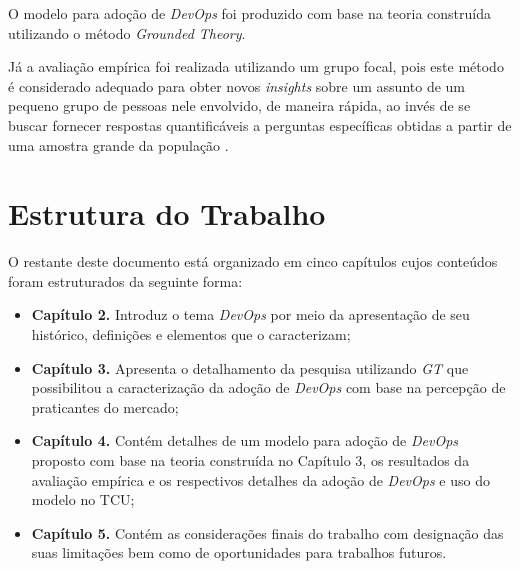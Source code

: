 O modelo para adoção de \textit{DevOps} foi produzido com base na teoria
construída utilizando o método \textit{Grounded Theory}.

Já a avaliação empírica foi realizada utilizando um grupo focal, pois este
método é considerado adequado para obter novos \textit{insights} sobre um
assunto de um pequeno grupo de pessoas nele envolvido, de maneira rápida, ao
invés de se buscar fornecer respostas quantificáveis a perguntas específicas
obtidas a partir de uma amostra grande da população \cite{focus_group_handbook,shull2007guide}.

\section{Estrutura do Trabalho}

O restante deste documento está organizado em cinco capítulos cujos conteúdos
foram estruturados da seguinte forma:

\begin{itemize}
\item \textbf{Capítulo 2.} Introduz o tema \textit{DevOps} por meio da
apresentação de seu histórico, definições e elementos que o caracterizam;
\item \textbf{Capítulo 3.} Apresenta o detalhamento da pesquisa utilizando
\textit{\acrfull{GT}} que possibilitou a caracterização da adoção de
\textit{DevOps} com base na percepção de praticantes do mercado;
\item \textbf{Capítulo 4.} Contém detalhes de um modelo para adoção de
\textit{DevOps} proposto com base na teoria construída no Capítulo 3, os
resultados da avaliação empírica e os respectivos detalhes da adoção de {\it DevOps}
e uso do modelo no \acrshort{TCU};
\item \textbf{Capítulo 5.} Contém as considerações finais do trabalho com
designação das suas limitações bem como de oportunidades para trabalhos futuros.
\end{itemize}




